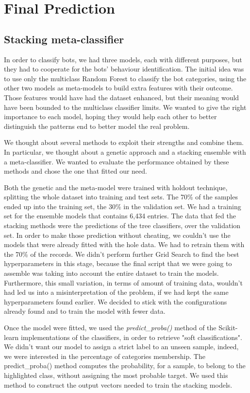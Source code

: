 \chapter{Final Prediction}

\section{Stacking meta-classifier}
In order to classify bots, we had three models, each with different purposes, but they had to cooperate for the bots' behaviour identification.
The initial idea was to use only the multiclass Random Forest to classify the bot categories, using the other two models as meta-models to build extra features with their outcome.
Those features would have had the dataset enhanced, but their meaning would have been bounded to the multiclass classifier limits.
We wanted to give the right importance to each model, hoping they would help each other to better distinguish the patterns end to better model the real problem.

We thought about several methods to exploit their strengths and combine them. In particular, we thought about a genetic approach and a stacking ensemble with a meta-classifier. 
We wanted to evaluate the performance obtained by these methods and chose the one that fitted our need.

Both the genetic and the meta-model were trained with holdout technique, splitting the whole dataset into training and test sets. The 70\% of the samples ended up into the training set, the 30\% in the validation set.
We had a training set for the ensemble models that contains 6,434 entries.
The data that fed the stacking methods were the predictions of the tree classifiers, over the validation set.
In order to make those prediction without cheating, we couldn't use the models that were already fitted with the hole data. We had to retrain them with the 70\% of the records. 
We didn't perform further Grid Search to find the best hyperparameters in this stage, because the final script that we were going to assemble was taking into account the entire dataset to train the models. Furthermore, this small variation, in terms of amount of training data, wouldn't had led us into a misinterpretation of the problem, if we had kept the same hyperparameters found earlier.
We decided to stick with the configurations already found and to train the model with fewer data.

Once the model were fitted, we used the \textit{predict\_proba()} method of the Scikit-learn implementations of the classifiers, in order to retrieve "soft classifications".
We didn't want our model to assign a strict label to an unseen sample, indeed, we were interested in the percentage of categories membership.
The predict\_proba() method computes the probability, for a sample, to belong to the highlighted class, without assigning the most probable target.
We used this method to construct the output vectors needed to train the stacking models.

